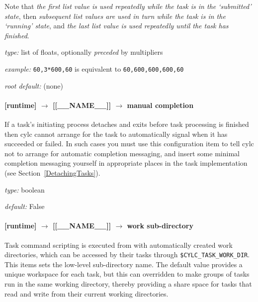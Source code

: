Note that {\em the first list value is used repeatedly while the task is
in the `submitted' state}, then {\em subsequent list values are used in
turn while the task is in the `running' state}, and {\em the last list
value is used repeatedly until the task has finished}.

\begin{myitemize}
\item {\em type:} list of floats, optionally {\em preceded} by multipliers
\item {\em example:} \lstinline=60,3*600,60= is equivalent 
        to \lstinline=60,600,600,600,60=
\item {\em root default:} (none)
\end{myitemize}



\paragraph[manual completion]{ [runtime] $\rightarrow$ [[\_\_NAME\_\_]] $\rightarrow$ manual completion}

If a task's initiating process detaches and exits before task processing
is finished then cylc cannot arrange for the task to automatically
signal when it has succeeded or failed. In such cases you must use this 
configuration item to tell cylc not to arrange for automatic completion
messaging, and insert some minimal completion messaging yourself in
appropriate places in the task implementation (see
Section~\ref{DetachingTasks}).

\begin{myitemize}
\item {\em type:} boolean
\item {\em default:} False
\end{myitemize}


\paragraph[work directory]{[runtime] $\rightarrow$ [[\_\_NAME\_\_]] $\rightarrow$ work sub-directory}

Task command scripting is executed from with automatically created work
directories, which can be accessed by their tasks through
\lstinline=$CYLC_TASK_WORK_DIR=.  This items sets the low-level
sub-directory name. The default value provides a unique workspace for
each task, but this can overridden to make groups of tasks run in the
same working directory, thereby providing a share space for tasks that 
read and write from their current working directories.

